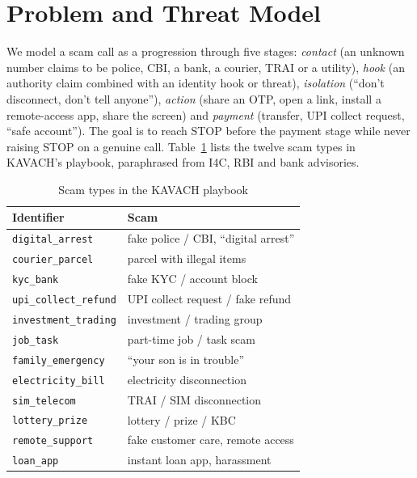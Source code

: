 \documentclass[conference]{IEEEtran}
\begin{document}
\section{Problem and Threat Model}\label{sec:problem}

We model a scam call as a progression through five stages: \emph{contact} (an unknown number claims to be police, CBI, a bank, a courier, TRAI or a utility), \emph{hook} (an authority claim combined with an identity hook or threat), \emph{isolation} (``don't disconnect, don't tell anyone''), \emph{action} (share an OTP, open a link, install a remote-access app, share the screen) and \emph{payment} (transfer, UPI collect request, ``safe account''). The goal is to reach STOP before the payment stage while never raising STOP on a genuine call. Table~\ref{tab:types} lists the twelve scam types in KAVACH's playbook, paraphrased from I4C, RBI and bank advisories.

\begin{table}[t]
\caption{Scam types in the KAVACH playbook}
\label{tab:types}
\centering
\footnotesize
\setlength{\tabcolsep}{3pt}
\begin{tabular}{@{}ll@{}}
\toprule
Identifier & Scam \\
\midrule
\texttt{digital\_arrest} & fake police / CBI, ``digital arrest'' \\
\texttt{courier\_parcel} & parcel with illegal items \\
\texttt{kyc\_bank} & fake KYC / account block \\
\texttt{upi\_collect\_refund} & UPI collect request / fake refund \\
\texttt{investment\_trading} & investment / trading group \\
\texttt{job\_task} & part-time job / task scam \\
\texttt{family\_emergency} & ``your son is in trouble'' \\
\texttt{electricity\_bill} & electricity disconnection \\
\texttt{sim\_telecom} & TRAI / SIM disconnection \\
\texttt{lottery\_prize} & lottery / prize / KBC \\
\texttt{remote\_support} & fake customer care, remote access \\
\texttt{loan\_app} & instant loan app, harassment \\
\bottomrule
\end{tabular}
\end{table}
\end{document}

